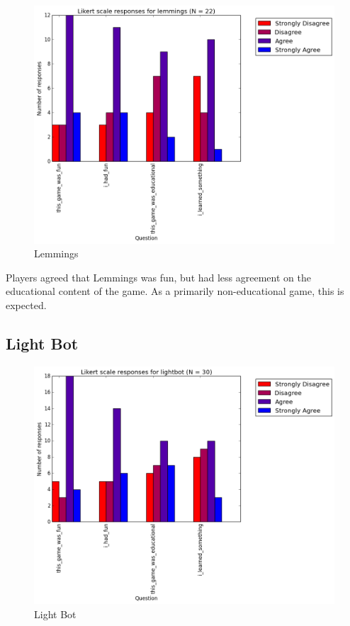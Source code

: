 				\begin{figure}[] 
				\centering 
				\includegraphics[width=\textwidth, height=.4\textheight, keepaspectratio=true]{lemmings_likert.png} 
				\caption{Lemmings}
				\end{figure}

				Players agreed that Lemmings was fun, but had less agreement on the educational content of the game. As a primarily non-educational game, this is expected.

			\subsection{Light Bot}

				\begin{figure}[] 
				\centering 
				\includegraphics[width=\textwidth, height=.4\textheight, keepaspectratio=true]{lightbot_likert.png} 
				\caption{Light Bot}
				\end{figure}

